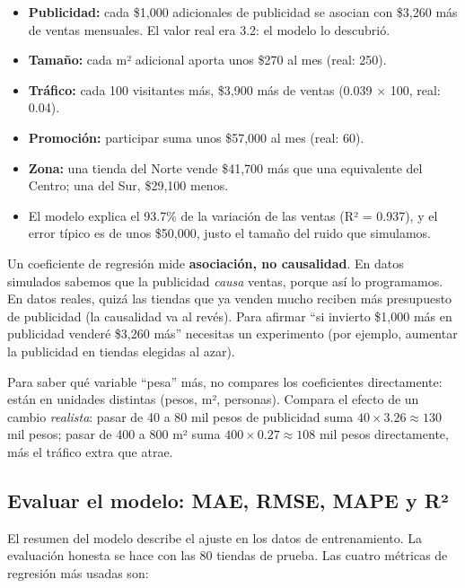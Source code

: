 \begin{itemize}
  \item \textbf{Publicidad:} cada \$1{,}000 adicionales de publicidad se asocian
        con \$3{,}260 más de ventas mensuales. El valor real era 3.2: el modelo
        lo descubrió.
  \item \textbf{Tamaño:} cada m² adicional aporta unos \$270 al mes (real: 250).
  \item \textbf{Tráfico:} cada 100 visitantes más, \$3{,}900 más de ventas
        (0.039 $\times$ 100, real: 0.04).
  \item \textbf{Promoción:} participar suma unos \$57{,}000 al mes (real: 60).
  \item \textbf{Zona:} una tienda del Norte vende \$41{,}700 más que una
        equivalente del Centro; una del Sur, \$29{,}100 menos.
  \item El modelo explica el 93.7\% de la variación de las ventas
        (R² = 0.937), y el error típico es de unos \$50{,}000, justo el tamaño
        del ruido que simulamos.
\end{itemize}

\begin{advertencia}
Un coeficiente de regresión mide \textbf{asociación, no causalidad}. En datos
simulados sabemos que la publicidad \emph{causa} ventas, porque así lo
programamos. En datos reales, quizá las tiendas que ya venden mucho reciben más
presupuesto de publicidad (la causalidad va al revés). Para afirmar ``si
invierto \$1{,}000 más en publicidad venderé \$3{,}260 más'' necesitas un
experimento (por ejemplo, aumentar la publicidad en tiendas elegidas al azar).
\end{advertencia}

\begin{consejo}
Para saber qué variable ``pesa'' más, no compares los coeficientes
directamente: están en unidades distintas (pesos, m², personas). Compara el
efecto de un cambio \emph{realista}: pasar de 40 a 80 mil pesos de publicidad
suma $40 \times 3.26 \approx 130$ mil pesos; pasar de 400 a 800 m² suma
$400 \times 0.27 \approx 108$ mil pesos directamente, más el tráfico extra que
atrae.
\end{consejo}

\subsection{Evaluar el modelo: MAE, RMSE, MAPE y R²}
\label{sec:m7-metricas-reg}

El resumen del modelo describe el ajuste en los datos de entrenamiento. La
evaluación honesta se hace con las 80 tiendas de prueba. Las cuatro métricas
de regresión más usadas son:

